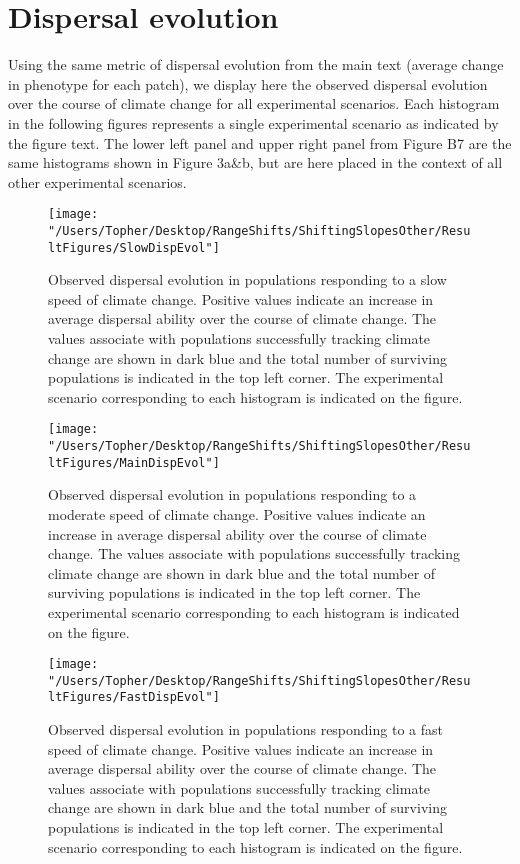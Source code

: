 \documentclass[12pt, oneside]{article}
\begin{document}
\newpage

\section*{Dispersal evolution}
Using the same metric of dispersal evolution from the main text (average change in phenotype for each patch), we display here the observed dispersal evolution over the course of climate change for all experimental scenarios. Each histogram in the following figures represents a single experimental scenario as indicated by the figure text. The lower left panel and upper right panel from Figure B7 are the same histograms shown in Figure 3a\&b, but are here placed in the context of all other experimental scenarios.

\begin{figure}
\centering
\texttt{[image: "/Users/Topher/Desktop/RangeShifts/ShiftingSlopesOther/ResultFigures/SlowDispEvol"]}
\vspace{-5mm}
\caption[LoF entry]{Observed dispersal evolution in populations responding to a slow speed of climate change. Positive values indicate an increase in average dispersal ability over the course of climate change. The values associate with populations successfully tracking climate change are shown in dark blue and the total number of surviving populations is indicated in the top left corner. The experimental scenario corresponding to each histogram is indicated on the figure.}
\label{fig:DispEvolSlow}
\end{figure}

\begin{figure}
\centering
\texttt{[image: "/Users/Topher/Desktop/RangeShifts/ShiftingSlopesOther/ResultFigures/MainDispEvol"]}
\vspace{-5mm}
\caption[LoF entry]{Observed dispersal evolution in populations responding to a moderate speed of climate change. Positive values indicate an increase in average dispersal ability over the course of climate change. The values associate with populations successfully tracking climate change are shown in dark blue and the total number of surviving populations is indicated in the top left corner. The experimental scenario corresponding to each histogram is indicated on the figure.}
\label{fig:DispEvolMain}
\end{figure}

\begin{figure}
\centering
\texttt{[image: "/Users/Topher/Desktop/RangeShifts/ShiftingSlopesOther/ResultFigures/FastDispEvol"]}
\vspace{-5mm}
\caption[LoF entry]{Observed dispersal evolution in populations responding to a fast speed of climate change. Positive values indicate an increase in average dispersal ability over the course of climate change. The values associate with populations successfully tracking climate change are shown in dark blue and the total number of surviving populations is indicated in the top left corner. The experimental scenario corresponding to each histogram is indicated on the figure.}
\label{fig:DispEvolFast}
\end{figure}
\end{document}

